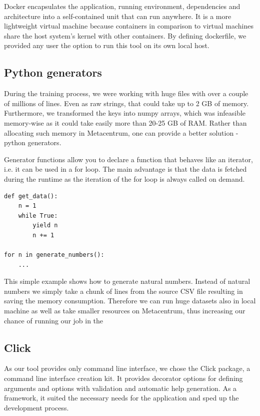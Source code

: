 Docker encapsulates the application, running environment, dependencies and architecture into a self-contained unit that can run anywhere. It is a more lightweight virtual machine because containers in comparison to virtual machines share the host system's kernel with other containers\cite{docker-blog}. By defining dockerfile, we provided any user the option to run this tool on its own local host.

\subsection{Python generators}

\label{python-generators}

During the training process, we were working with huge files with over a couple of millions of lines. Even as raw strings, that could take up to 2 GB of memory. Furthermore, we transformed the keys into numpy arrays, which was infeasible memory-wise as it could take easily more than 20-25 GB of RAM. Rather than allocating such memory in Metacentrum, one can provide a better solution - python generators\cite{python-gen}. 

Generator functions allow you to declare a function that behaves like an iterator, i.e. it can be used in a for loop. The main advantage is that the data is fetched during the runtime as the iteration of the for loop is always called on demand.

\begin{verbatim}
def get_data():
    n = 1
    while True:
        yield n
        n += 1
		
for n in generate_numbers():
    ...
\end{verbatim}

This simple example shows how to generate natural numbers. Instead of natural numbers we simply take a chunk of lines from the source CSV file resulting in saving the memory consumption. Therefore we can run huge datasets also in local machine as well as take smaller resources on Metacentrum, thus increasing our chance of running our job in the 

\subsection{Click}

As our tool provides only command line interface, we chose the Click package\cite{click}, a command line interface creation kit. It provides decorator options for defining arguments and options with validation and automatic help generation. As a framework, it suited the necessary needs for the application and sped up the development process.

